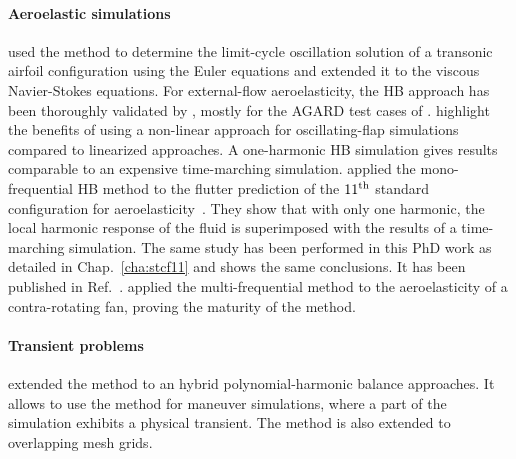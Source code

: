 \paragraph{Aeroelastic simulations}
\citet{Thomas2002a} used the method to
determine the limit-cycle oscillation solution
of a transonic airfoil configuration using the
Euler equations and \citet{Thomas2004b} extended
it to the viscous Navier-Stokes equations.
For external-flow aeroelasticity, the HB approach has 
been thoroughly 
validated by \citet{Gopinath2005, JSicot2008, Woodgate2009, JDufour2009}, 
mostly for the AGARD test cases of \citet{Davis1982}. 
\citet{JDufour2009} highlight the benefits of using a 
non-linear approach for oscillating-flap simulations
compared to linearized approaches. A one-harmonic HB simulation
gives results comparable to an expensive time-marching simulation.
\citet{Huang2013} applied the mono-frequential
HB method to the flutter prediction of the 
$11\textsuperscript{th}$ 
standard configuration for aeroelasticity~\cite{Fransson1999}.
They show that with only one harmonic, the local
harmonic response of the fluid is superimposed
with the results of a time-marching simulation.
The same study has been performed in this PhD work
as detailed in Chap.~\ref{cha:stcf11}
and shows the same conclusions. It has been
published in Ref.~\cite{JSicot2012}.
\citet{JSicot2013} applied the multi-frequential 
method to the
aeroelasticity of a contra-rotating fan, proving
the maturity of the method.


\paragraph{Transient problems}
\citet{Mavriplis2012} extended the method to 
an hybrid polynomial-harmonic balance approaches. 
It allows to use the method for maneuver simulations, 
where a part of the simulation exhibits a physical transient.
The method is also extended to overlapping mesh grids.

